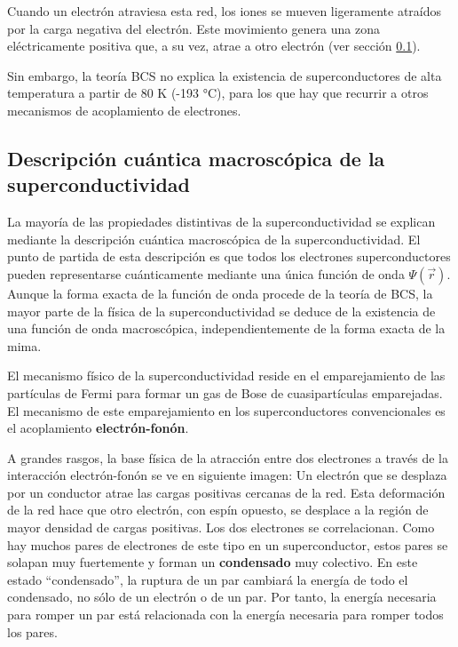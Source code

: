 Cuando un electrón atraviesa esta red, los iones se mueven ligeramente atraídos por la carga negativa del electrón. Este movimiento genera una zona eléctricamente positiva que, a su vez, atrae a otro electrón (ver sección \ref{sec_scq_descrip_macro_superconductividad}).  

Sin embargo, la teoría BCS no explica la existencia de superconductores de alta temperatura a partir de 80 K (-193 °C), para los que hay que recurrir a otros mecanismos de acoplamiento de electrones.


\subsection{Descripción cuántica macroscópica de la superconductividad} \label{sec_scq_descrip_macro_superconductividad}

La mayoría de las propiedades distintivas de la superconductividad se explican mediante la descripción cuántica macroscópica de la superconductividad. El punto de partida de esta descripción es que todos los electrones superconductores pueden representarse cuánticamente mediante una única función de onda $\Psi(\vec{r})$. Aunque la forma exacta de la función de onda procede de la teoría de BCS, la mayor parte de la física de la superconductividad se deduce de la existencia de una función de onda macroscópica, independientemente de la forma exacta de la mima.

El mecanismo físico de la superconductividad reside en el emparejamiento de las partículas de Fermi para formar un gas de Bose de cuasipartículas emparejadas. El mecanismo de este emparejamiento en los superconductores convencionales es el acoplamiento \textbf{electrón-fonón}. 

A grandes rasgos, la base física de la atracción entre dos electrones a través de la interacción electrón-fonón se ve en siguiente imagen: Un electrón que se desplaza por un conductor atrae las cargas positivas cercanas de la red. Esta deformación de la red hace que otro electrón, con espín opuesto, se desplace a la región de mayor densidad de cargas positivas. Los dos electrones se correlacionan. Como hay muchos pares de electrones de este tipo en un superconductor, estos pares se solapan muy fuertemente y forman un \textbf{condensado} muy colectivo. En este estado ``condensado'', la ruptura de un par cambiará la energía de todo el condensado, no sólo de un electrón o de un par. Por tanto, la energía necesaria para romper un par está relacionada con la energía necesaria para romper todos los pares. 

